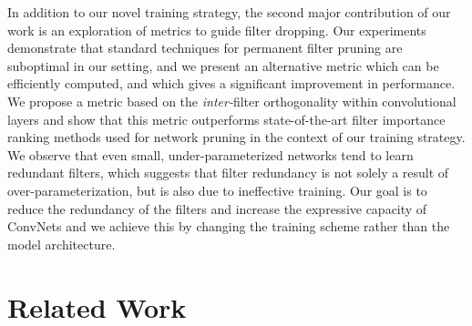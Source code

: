 In addition to our novel training strategy, the second major contribution of our work is an exploration of metrics to guide filter dropping.
Our experiments demonstrate that standard techniques for permanent filter pruning are suboptimal in our setting, and we present an alternative metric which can be efficiently computed, and which gives a significant improvement in performance.
We propose a metric based on the \textit{inter-}filter orthogonality within convolutional layers and show that this metric outperforms state-of-the-art filter importance ranking methods used for network pruning in the context of our training strategy.
We observe that even small, under-parameterized networks tend to learn redundant filters, which suggests that filter redundancy is not solely a result of over-parameterization, but is also due to ineffective training.
Our goal is to reduce the redundancy of the filters and increase the expressive capacity of ConvNets and we achieve this by changing the training scheme rather than the model architecture.



\section{Related Work}

